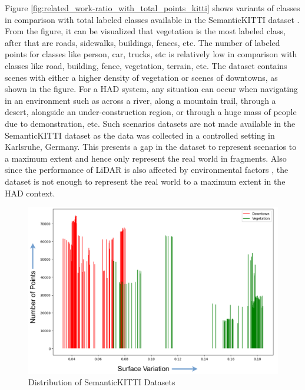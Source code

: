 Figure \ref{fig:related_work-ratio_with_total_points_kitti} shows variants of classes in comparison with total labeled classes available in the SemanticKITTI dataset \parencite{behley2019semantickitti, sem_kitti_total_points_ratio}. From the figure, it can be visualized that vegetation is the most labeled class, after that are roads, sidewalks, buildings, fences, etc. The number of labeled points for classes like person, car, trucks, etc is relatively low in comparison with classes like road, building, fence, vegetation, terrain, etc. The dataset contains scenes with either a higher density of vegetation or scenes of downtowns, as shown in the figure. For a HAD system, any situation can occur when navigating in an environment such as across a river, along a mountain trail, through a desert, alongside an under-construction region, or through a huge mass of people due to demonstration, etc. Such scenarios datasets are not made available in the SemanticKITTI dataset as the data was collected in a controlled setting in Karlsruhe, Germany. This presents a gap in the dataset to represent scenarios to a maximum extent and hence only represent the real world in fragments. Also since the performance of LiDAR is also affected by environmental factors \parencite{park2023automotive}, the dataset is not enough to represent the real world to a maximum extent in the HAD context.

\begin{figure}[htb]
    \centering
    \includegraphics[width=1\linewidth]{97_graphics/related_work/downtown_and_vegetation_sv.pdf}
    \caption{Distribution of SemanticKITTI Datasets}
    \label{fig:related_work-downtown_and_vegetation_sv}
\end{figure}

